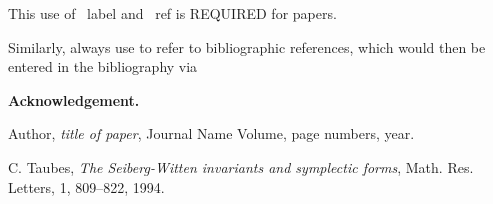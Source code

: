 \documentclass{cmslatex}
\begin{document}
This use of \ label and \ ref is REQUIRED for  papers.

Similarly, always use \cite{biblabelname} to refer to
bibliographic references, which would then be entered in the
bibliography via










\medskip

{\bf Acknowledgement.}
\medskip

\begin{thebibliography}{10}




Author, {\em title of paper}, Journal Name
Volume,  page numbers, year.


C. Taubes, {\em The Seiberg-Witten invariants
 and symplectic forms}, Math. Res. Letters, 1, 809--822, 1994.
\end{thebibliography}
\end{document}
